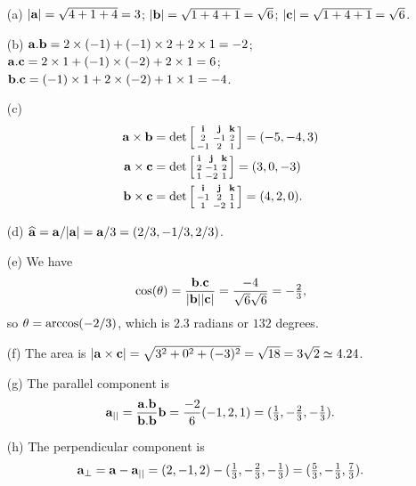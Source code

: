 \documentclass[a4paper]{amsart}
\renewenvironment{solution}{\SolutionInline}{\endSolutionInline}
\begin{document}
\begin{solution}
 \begin{itemize}
  \item[(a)] $|\mathbf{a}|=\sqrt{4+1+4}=3$; $|\mathbf{b}|=\sqrt{1+4+1}=\sqrt{6}$; 
   $|\mathbf{c}|=\sqrt{1+4+1}=\sqrt{6}$.
  \item[(b)]
   $\mathbf{a}.\mathbf{b}=2\times(-1)+(-1)\times 2+2\times 1=-2$;
   $\mathbf{a}.\mathbf{c}=2\times 1+(-1)\times(-2)+2\times 1=6$;
   $\mathbf{b}.\mathbf{c}=(-1)\times 1+2\times(-2)+1\times 1=-4$.
  \item[(c)] 
   \begin{align*}
    \mathbf{a}\times\mathbf{b} &= \det\left[\begin{smallmatrix} \mathbf{i}&\mathbf{j}&\mathbf{k} \\ 2&-1&2 \\ -1&2&1 \end{smallmatrix}\right]
     = (-5,-4,3) \\
    \mathbf{a}\times\mathbf{c} &= \det\left[\begin{smallmatrix} \mathbf{i}&\mathbf{j}&\mathbf{k} \\ 2&-1&2 \\ 1&-2&1 \end{smallmatrix}\right]
     = (3,0,-3) \\
    \mathbf{b}\times\mathbf{c} &= \det\left[\begin{smallmatrix} \mathbf{i}&\mathbf{j}&\mathbf{k} \\ -1&2&1 \\ 1&-2&1 \end{smallmatrix}\right]
     = (4,2,0).
   \end{align*}
  \item[(d)] $\widehat{\mathbf{a}}=\mathbf{a}/|\mathbf{a}|=\mathbf{a}/3=(2/3,-1/3,2/3)$.
  \item[(e)] We have 
   \[ \cos(\theta)=\frac{\mathbf{b}.\mathbf{c}}{|\mathbf{b}||\mathbf{c}|} =
       \frac{-4}{\sqrt{6}\sqrt{6}} = -\tfrac{2}{3},
   \]
   so $\theta=\arccos(-2/3)$, which is $2.3$ radians or $132$ degrees.
  \item[(f)] The area is
   $|\mathbf{a}\times\mathbf{c}|=\sqrt{3^2+0^2+(-3)^2}=\sqrt{18}=3\sqrt{2}\simeq 4.24$.
  \item[(g)] The parallel component is 
   \[ \mathbf{a}_{||} = \frac{\mathbf{a}.\mathbf{b}}{\mathbf{b}.\mathbf{b}} \mathbf{b}
       = \frac{-2}{6}(-1,2,1) = 
        (\tfrac{1}{3},-\tfrac{2}{3},-\tfrac{1}{3}).
   \]
  \item[(h)] The perpendicular component is 
   \[ \mathbf{a}_{\perp} = \mathbf{a} - \mathbf{a}_{||} =
      (2,-1,2)-(\tfrac{1}{3},-\tfrac{2}{3},-\tfrac{1}{3}) =
      (\tfrac{5}{3},-\tfrac{1}{3},\tfrac{7}{3}).
   \]
 \end{itemize}
\end{solution}
\end{document}
